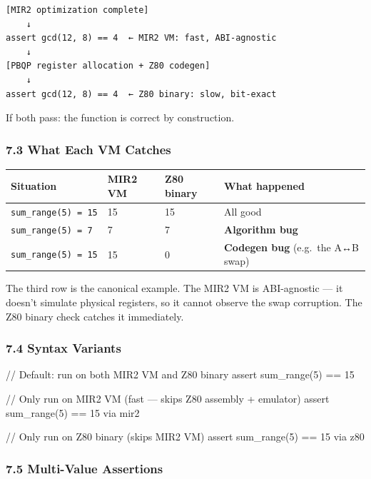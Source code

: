 \documentclass[
  11pt,
]{article}
\newenvironment{Shaded}{}{}
\newcommand{\NormalTok}[1]{#1}
\begin{document}
\begin{verbatim}
[MIR2 optimization complete]
    ↓
assert gcd(12, 8) == 4  ← MIR2 VM: fast, ABI-agnostic
    ↓
[PBQP register allocation + Z80 codegen]
    ↓
assert gcd(12, 8) == 4  ← Z80 binary: slow, bit-exact
\end{verbatim}

If both pass: the function is correct by construction.

\subsubsection{7.3 What Each VM Catches}\label{what-each-vm-catches}

\begin{longtable}[]{@{}llll@{}}
\toprule\noalign{}
Situation & MIR2 VM & Z80 binary & What happened \\
\midrule\noalign{}
\endhead
\bottomrule\noalign{}
\endlastfoot
\texttt{sum\_range(5)\ =\ 15} & 15 & 15 & All good \\
\texttt{sum\_range(5)\ =\ 7} & 7 & 7 & \textbf{Algorithm bug} \\
\texttt{sum\_range(5)\ =\ 15} & 15 & 0 & \textbf{Codegen bug} (e.g.~the
A↔B swap) \\
\end{longtable}

The third row is the canonical example. The MIR2 VM is ABI-agnostic ---
it doesn't simulate physical registers, so it cannot observe the swap
corruption. The Z80 binary check catches it immediately.

\subsubsection{7.4 Syntax Variants}\label{syntax-variants}

\begin{Shaded}
\begin{Highlighting}[]
\NormalTok{// Default: run on both MIR2 VM and Z80 binary}
\NormalTok{assert sum\_range(5) == 15}

\NormalTok{// Only run on MIR2 VM (fast — skips Z80 assembly + emulator)}
\NormalTok{assert sum\_range(5) == 15 via mir2}

\NormalTok{// Only run on Z80 binary (skips MIR2 VM)}
\NormalTok{assert sum\_range(5) == 15 via z80}
\end{Highlighting}
\end{Shaded}

\subsubsection{7.5 Multi-Value Assertions}\label{multi-value-assertions}
\end{document}

